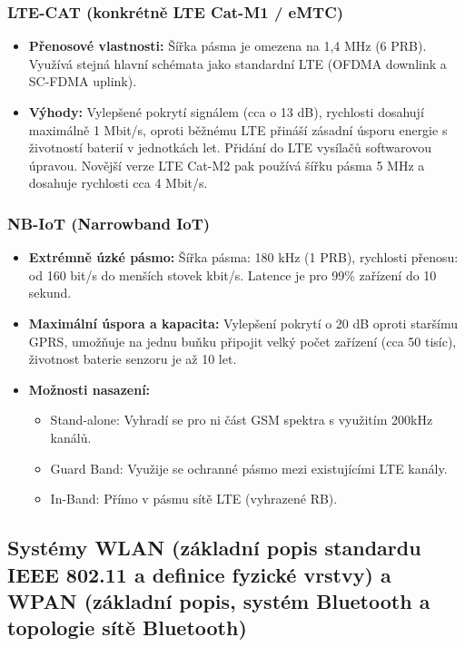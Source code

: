 		\subsubsection*{LTE-CAT (konkrétně LTE Cat-M1 / eMTC)}
			\begin{itemize}
				\item \textbf{Přenosové vlastnosti:} Šířka pásma je omezena na 1,4 MHz (6 PRB). Využívá stejná hlavní schémata jako standardní LTE (OFDMA downlink a SC-FDMA uplink).
				\item \textbf{Výhody:} Vylepšené pokrytí signálem (cca o 13 dB), rychlosti dosahují maximálně 1 Mbit/s, oproti běžnému LTE přináší zásadní úsporu energie s životností baterií v jednotkách let. Přidání do LTE vysílačů softwarovou úpravou. Novější verze LTE Cat-M2 pak používá šířku pásma 5 MHz a dosahuje rychlosti cca 4 Mbit/s.
			\end{itemize}
		\subsubsection*{NB-IoT (Narrowband IoT)} 
			\begin{itemize}
				\item \textbf{Extrémně úzké pásmo:} Šířka pásma: 180 kHz (1 PRB), rychlosti přenosu: od 160 bit/s do menších stovek kbit/s. Latence je pro 99\% zařízení do 10 sekund.
				\item \textbf{Maximální úspora a kapacita:} Vylepšení pokrytí o 20 dB oproti staršímu GPRS, umožňuje na jednu buňku připojit velký počet zařízení (cca 50 tisíc), životnost baterie senzoru je až 10 let.
				\item \textbf{Možnosti nasazení:}
				\begin{itemize}
					\item Stand-alone: Vyhradí se pro ni část GSM spektra s využitím 200kHz kanálů.
					\item Guard Band: Využije se ochranné pásmo mezi existujícími LTE kanály.
					\item In-Band: Přímo v pásmu sítě LTE (vyhrazené RB).
				\end{itemize}
		\end{itemize}
	
	\subsection{Systémy WLAN (základní popis standardu IEEE 802.11 a definice fyzické vrstvy) a WPAN (základní popis, systém Bluetooth a topologie sítě Bluetooth)}
